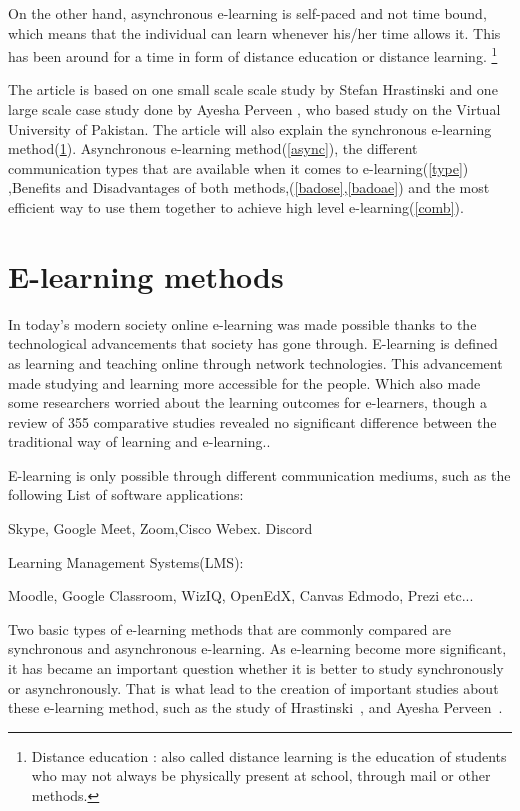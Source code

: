 \documentclass[10pt,twoside,english,a4paper]{article}
\begin{document}
On the other hand, asynchronous e-learning is self-paced and not time bound, which means that the individual can learn whenever his/her time allows it. This has been around for a time in form of distance education or distance learning.
\footnote{Distance education : also called distance learning is the education of students who may not always be physically present at school, through mail or other methods.}

The article is based on one small scale scale study by Stefan Hrastinski and one large scale case study done by Ayesha Perveen , who based study on the Virtual University of Pakistan. The article will also explain the synchronous e-learning method(\ref{sync}).
Asynchronous e-learning method(\ref{async}),
the different communication types that are available when it comes to e-learning(\ref{type}) ,Benefits and Disadvantages of both methods,(\ref{badose},\ref{badoae})
and the most efficient way to use them together to achieve high level e-learning(\ref{comb}). 








\section{E-learning methods} \label{sync}

In today's modern society online e-learning was made possible thanks to the technological advancements that society has gone through. E-learning is defined as learning and teaching online through network technologies. This advancement made studying and learning more accessible for the people. Which also made some researchers worried about the learning outcomes for e-learners, though a review of 355 comparative studies revealed no significant difference between the traditional way of learning and e-learning.\cite{Russell:TNDP}.

E-learning is only possible through different communication mediums, such as the following
List of software applications:

Skype, Google Meet, Zoom,Cisco Webex. Discord 

Learning Management Systems(LMS): 

Moodle, Google Classroom, WizIQ, OpenEdX, Canvas
Edmodo, Prezi etc...



Two basic types of e-learning methods that are commonly compared are synchronous and asynchronous e-learning.
As e-learning become more significant, it has became an important question whether it is better to study  synchronously or asynchronously.
That is what lead to the creation of important studies about these e-learning method, such as the study of Hrastinski~\cite{Hrastinski:E-learning}, and Ayesha Perveen~\cite{Perveen:E-learning}.
\end{document}
